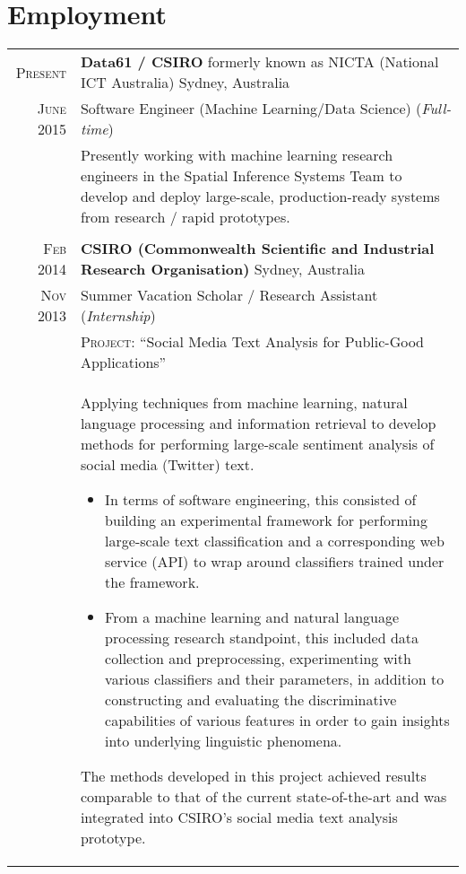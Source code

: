 \documentclass[a4paper,10pt]{article} %
\begin{document}

\section{Employment}

\begin{longtable}{r|p{13.8cm}}
  \textsc{Present} & \textbf{Data61 / CSIRO} formerly known as NICTA {\small (National ICT Australia)}
    \hfill Sydney, Australia \\
  \textsc{June 2015} & Software Engineer (Machine Learning/Data Science) 
    \hfill (\emph{Full-time}) \\
  & {\footnotesize
      Presently working with machine learning research engineers in the Spatial 
      Inference Systems Team to develop and deploy large-scale, production-ready
      systems from research / rapid prototypes.
    } \\
        
  \multicolumn{2}{c}{}\\

  \textsc{Feb 2014}	& \textbf{CSIRO {\small (Commonwealth Scientific and Industrial 
    Research Organisation)}} 
    \hfill Sydney, Australia \\
  \textsc{Nov 2013} & Summer Vacation Scholar / Research Assistant 
    \hfill (\emph{Internship}) \\
  & {\small \textsc{Project}: ``Social Media Text Analysis for 
      Public-Good Applications''}\\
  & {\footnotesize
      Applying techniques from machine learning, natural language processing 
      and information retrieval to develop methods for performing large-scale 
      sentiment analysis of social media (Twitter) text.
      \begin{itemize}
        \item In terms of software engineering, this consisted of building an 
        experimental framework for performing large-scale text classification 
        and a corresponding web service (API) to wrap around classifiers trained 
        under the framework.
        \item From a machine learning and natural language processing research 
        standpoint, this included data collection and preprocessing, experimenting 
        with various classifiers and their parameters, in addition to constructing 
        and evaluating the discriminative capabilities of various features in 
        order to gain insights into underlying linguistic phenomena.
      \end{itemize}
      The methods developed in this project achieved results comparable to that 
      of the current state-of-the-art and was integrated into CSIRO's social 
      media text analysis prototype.
    }\\
				

\end{longtable}
\end{document}
